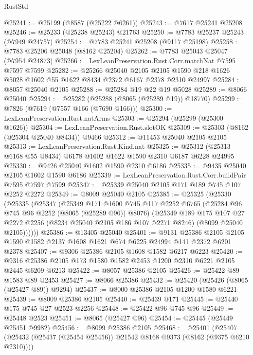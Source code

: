\begin{lexlean}{RustStd}
\begin{coremodule}
@25241 := @25199 (@8587 (@25222 @6261))
@25243 := @7617 @25241 @25208
@25246 := @25233 (@25238 @25243) @21763
@25250 := @7783 @25237 @25243 (@7949 @24757)
@25254 := @7783 @25241 @25208 (@9117 @25198)
@25258 := @7783 @25206 @25048 (@8162 @25204)
@25262 := @7783 @25043 @25047 (@7954 @24873)
@25266 := LexLeanPreservation.Rust.Corr.matchNat @7595 @7597 @7599
@25282 := @25266
    @25040
    @2105
    @2105
    @1590
    @218
    @1626
    @5028
    @1602
    @55
    @1622
    @8434
    @2372
    @6167
    @2378
    @2310
    @24997
@25284 := @8057 @25040 @2105
@25288 := @25284 @19 @22 @19 @5028
@25289 := @8066 @25040
@25294 := @25282 (@25288 (@8065 (@25289 @19)) @18770)
@25299 := @7826 (@7619 (@7557 @166 (@7690 @166)))
@25300 := LexLeanPreservation.Rust.natArms
@25303 := @25294 (@25299 (@25300 @1626))
@25304 := LexLeanPreservation.Rust.slotOK
@25309 := @25303 (@8162 (@25304 @25040 @8434)) @9466
@25312 := @11453 @25040 @2105 @2105
@25313 := LexLeanPreservation.Rust.Kind.nat
@25325 := @25312 (@25313 @6168 @55 @8434) @6178 @1602 @1622 @1590 @2310 @6187 @6228 @24995
@25330 := @9426 @25040 @1602 @1590 @2310 @6186
@25335 := @9435 @25040 @2105 @1602 @1590 @6186
@25339 := LexLeanPreservation.Rust.Corr.buildPair @7595 @7597 @7599
@25347 := @25339 @25040 @2105 @171 @189 @745 @107 @2252 @2272
@25349 := @8009 @25040 @2105
@25385 := @25325
    (@25330
      (@25335
        (@25347
          (@25349
            @171
            @1600
            @745
            @117
            @2252
            @6765
            (@25284 @96 @745 @96 @2252 (@8065 (@25289 @96)) @8076)
            (@25349
              @189
              @175
              @107
              @27
              @2272
              @2256
              (@8234 @25040 @2105 @186 @107 @2271 @8246)
              (@8099 @25040 @2105))))))
@25386 := @13405 @25040
@25401 := @9131
    @25386
    @2105
    @2105
    @1590
    @1582
    @2137
    @1608
    @1621
    @674
    @6225
    @24994
    @141
    @2372
    @6201
    @2378
@25407 := @9306 @25386 @2105 @1608 @1582 @6217 @6223
@25420 := @9316 @25386 @2105 @173 @1580 @1582 @2453 @1200 @2310 @6221 @2105 @2445 @6209 @6213
@25422 := @8057 @25386 @2105
@25426 := @25422 @89 @1583 @89 @2453
@25427 := @8066 @25386
@25432 := @25420 (@25426 (@8065 (@25427 @89)) @9294)
@25437 := @8000 @25386 @2105 @1200 @1580 @6221
@25439 := @8009 @25386 @2105
@25440 := @25439 @171
@25445 := @25440 @175 @745 @27 @2523 @2256
@25448 := @25422 @96 @745 @96
@25449 := @25448 @2523
@25451 := @8065 (@25427 @96)
@25454 := @25445 (@25449 @25451 @9982)
@25456 := @8099 @25386 @2105
@25468 := @25401
    (@25407 (@25432 (@25437 (@25454 @25456)) @21542 @8168 @9373 (@8162 (@9375 @6210 @2310))))

\end{coremodule}
\end{lexlean}
